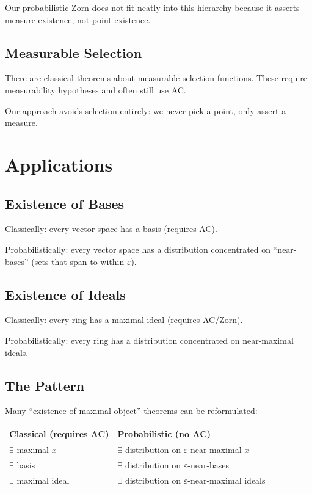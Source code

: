 \documentclass[11pt,a4paper]{article}
\begin{document}
Our probabilistic Zorn does not fit neatly into this hierarchy because it asserts measure existence, not point existence.

\subsection{Measurable Selection}

There are classical theorems about measurable selection functions. These require measurability hypotheses and often still use AC.

Our approach avoids selection entirely: we never pick a point, only assert a measure.

\section{Applications}

\subsection{Existence of Bases}

Classically: every vector space has a basis (requires AC).

Probabilistically: every vector space has a distribution concentrated on ``near-bases'' (sets that span to within $\varepsilon$).

\subsection{Existence of Ideals}

Classically: every ring has a maximal ideal (requires AC/Zorn).

Probabilistically: every ring has a distribution concentrated on near-maximal ideals.

\subsection{The Pattern}

Many ``existence of maximal object'' theorems can be reformulated:
\begin{center}
\begin{tabular}{ll}
\toprule
Classical (requires AC) & Probabilistic (no AC) \\
\midrule
$\exists$ maximal $x$ & $\exists$ distribution on $\varepsilon$-near-maximal $x$ \\
$\exists$ basis & $\exists$ distribution on $\varepsilon$-near-bases \\
$\exists$ maximal ideal & $\exists$ distribution on $\varepsilon$-near-maximal ideals \\
\bottomrule
\end{tabular}
\end{center}
\end{document}
